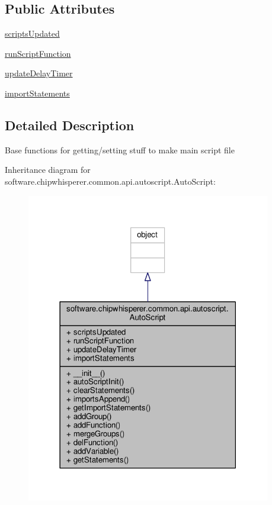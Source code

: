 \subsection*{Public Attributes}
\begin{DoxyCompactItemize}
\item 
\hyperlink{classsoftware_1_1chipwhisperer_1_1common_1_1api_1_1autoscript_1_1AutoScript_a4ea19590e48600d369919929a83bd663}{scripts\+Updated}
\item 
\hyperlink{classsoftware_1_1chipwhisperer_1_1common_1_1api_1_1autoscript_1_1AutoScript_a0110bb83812414043606d3bea1317747}{run\+Script\+Function}
\item 
\hyperlink{classsoftware_1_1chipwhisperer_1_1common_1_1api_1_1autoscript_1_1AutoScript_a8a11dd58c737483f46269c334e0c9d1d}{update\+Delay\+Timer}
\item 
\hyperlink{classsoftware_1_1chipwhisperer_1_1common_1_1api_1_1autoscript_1_1AutoScript_ac16974ee6baa9b1293eef755635c333e}{import\+Statements}
\end{DoxyCompactItemize}


\subsection{Detailed Description}
\begin{DoxyVerb}Base functions for getting/setting stuff to make main script file\end{DoxyVerb}
 

Inheritance diagram for software.\+chipwhisperer.\+common.\+api.\+autoscript.\+Auto\+Script\+:\nopagebreak
\begin{figure}[H]
\begin{center}
\leavevmode
\includegraphics[width=302pt]{d6/dd8/classsoftware_1_1chipwhisperer_1_1common_1_1api_1_1autoscript_1_1AutoScript__inherit__graph}
\end{center}
\end{figure}


